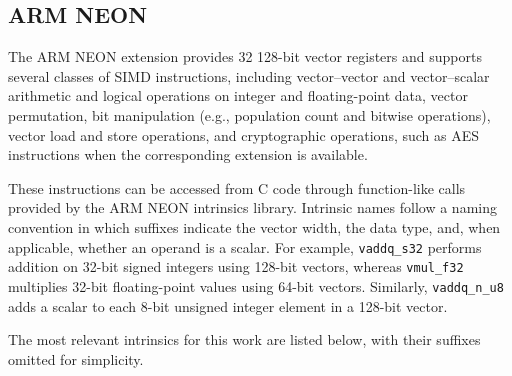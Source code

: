 

\subsection{ARM NEON}

The ARM NEON extension provides 32 128-bit vector registers and supports several classes of SIMD instructions, including vector–vector and vector–scalar arithmetic and logical operations on integer and floating-point data, vector permutation, bit manipulation (e.g., population count and bitwise operations), vector load and store operations, and cryptographic operations, such as AES instructions when the corresponding extension is available.

These instructions can be accessed from C code through function-like calls provided by the ARM NEON intrinsics library. Intrinsic names follow a naming convention in which suffixes indicate the vector width, the data type, and, when applicable, whether an operand is a scalar. For example, \texttt{vaddq\_s32} performs addition on 32-bit signed integers using 128-bit vectors, whereas \texttt{vmul\_f32} multiplies 32-bit floating-point values using 64-bit vectors. Similarly, \texttt{vaddq\_n\_u8} adds a scalar to each 8-bit unsigned integer element in a 128-bit vector.

The most relevant intrinsics for this work are listed below, with their suffixes omitted for simplicity.

